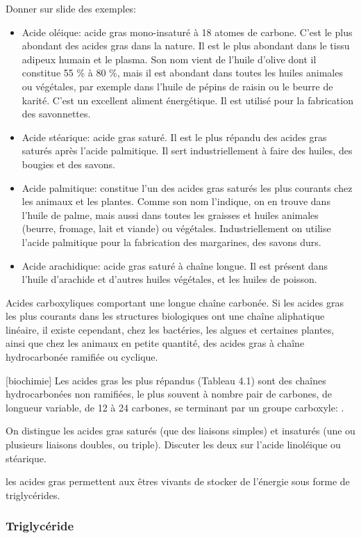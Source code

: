 \documentclass[11pt]{report}
\numberwithin{figure}{section}
\numberwithin{equation}{section}
\numberwithin{table}{section}
\newcommand{\1}{\boldsymbol{1}}
\begin{document}
Donner sur slide des exemples: 
\begin{itemize}
\item Acide oléique:  acide gras mono-insaturé à 18 atomes de carbone. C'est le plus abondant des acides gras dans la nature. Il est le plus abondant dans le tissu adipeux humain et le plasma. Son nom vient de l'huile d'olive dont il constitue 55 \% à 80 \%, mais il est abondant dans toutes les huiles animales ou végétales, par exemple dans l'huile de pépins de raisin ou le beurre de karité. C'est un excellent aliment énergétique. Il est utilisé pour la fabrication des savonnettes.
\item Acide stéarique: acide gras saturé.  Il est le plus répandu des acides gras saturés après l'acide palmitique. Il sert industriellement à faire des huiles, des bougies et des savons.
\item Acide palmitique: constitue l'un des acides gras saturés les plus courants chez les animaux et les plantes. Comme son nom l'indique, on en trouve dans l'huile de palme, mais aussi dans toutes les graisses et huiles animales (beurre, fromage, lait et viande) ou végétales. Industriellement on utilise l'acide palmitique pour la fabrication des margarines, des savons durs. 
\item Acide arachidique:  acide gras saturé à chaîne longue. Il est présent dans l'huile d'arachide et d'autres huiles végétales, et les huiles de poisson.
\end{itemize}

Acides carboxyliques comportant une longue chaîne carbonée. Si les acides gras les plus courants dans les structures biologiques ont une chaîne aliphatique linéaire, il existe cependant, chez les bactéries, les algues et certaines plantes, ainsi que chez les animaux en petite quantité, des acides gras à chaîne hydrocarbonée ramifiée ou cyclique.

[biochimie] Les acides gras les plus répandus (Tableau 4.1) sont des chaînes hydrocarbonées non ramifiées,
le plus souvent à nombre pair de carbones, de longueur variable, de 12 à 24 carbones,
se terminant par un groupe carboxyle: .

On distingue les acides gras saturés (que des liaisons simples) et insaturés (une ou plusieurs liaisons doubles, ou triple). Discuter les deux sur l'acide linoléique ou stéarique.

les acides gras permettent aux êtres vivants de stocker de l'énergie sous forme de triglycérides.

\subsubsection{Triglycéride}
\end{document}
